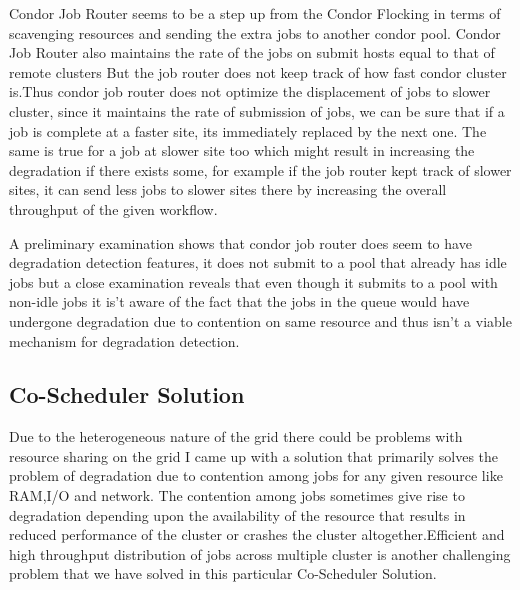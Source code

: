 \documentclass[ms,electronic,double]{nuthesis}
\begin{document}
Condor Job Router seems to be a step up from the Condor Flocking in terms of 
scavenging resources and sending the extra jobs to another condor pool. Condor 
Job Router also maintains the rate of the jobs on submit hosts equal to that of remote clusters But the job 
router does not keep track of how fast condor cluster is.Thus 
condor job router does not optimize the displacement of jobs to slower 
cluster, since it maintains the rate of submission of jobs, we can be sure that if a job is complete 
at a faster site, its immediately replaced by the next one. The same is true for a job at slower site too
which might result in increasing the degradation if there exists some, for example if the job router kept track of slower sites, it
can send less jobs to slower sites there by increasing the overall throughput of the given workflow.

A preliminary examination shows that condor job router does seem to have degradation detection features, 
it does not submit to a pool that already has idle jobs but a close examination reveals that even though it
submits to a pool with non-idle jobs it is't aware of the fact that the jobs in the queue would have 
undergone degradation due to contention on same resource and thus isn't a viable mechanism for degradation detection.
  
\subsection{Co-Scheduler Solution}
Due to the heterogeneous nature of the grid there could be problems with resource sharing on the grid I 
came up with a solution that primarily solves the problem of degradation due to contention among 
jobs for any given resource like RAM,I/O and network. The contention among jobs sometimes give rise to 
degradation depending upon the availability of the resource that results in reduced performance of the cluster or crashes the cluster
altogether.Efficient and high throughput
distribution of jobs across multiple cluster is another challenging problem that we have solved in 
this particular Co-Scheduler Solution. 
\end{document}
